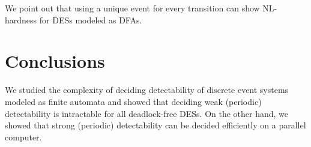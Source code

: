 \documentclass[twocolumn,amsthm]{autartx}
\begin{document}
  We point out that using a unique event for every transition can show NL-hardness for DESs modeled as DFAs.
  

\section{Conclusions}
  We studied the complexity of deciding detectability of discrete event systems modeled as finite automata and showed that deciding weak (periodic) detectability is intractable for all deadlock-free DESs. On the other hand, we showed that strong (periodic) detectability can be decided efficiently on a parallel computer. 
  




\end{document}
